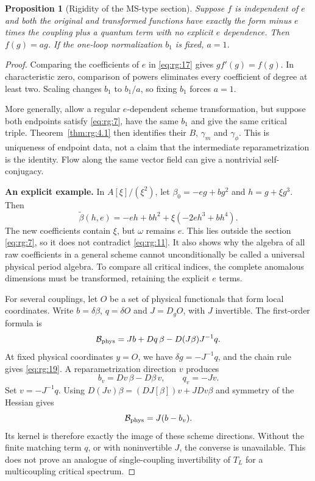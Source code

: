 \documentclass[11pt,a4paper,oneside]{article}
\theoremstyle{plain}
\newtheorem{proposition}[theorem]{Proposition}
\theoremstyle{definition}
\theoremstyle{remark}
\numberwithin{equation}{section}
\begin{document}
\begin{proposition}[Rigidity of the MS-type section]\label{thm:rg:6.1}
Suppose $f$ is independent of $e$ and both the original and transformed functions have exactly the form minus $e$ times the coupling plus a quantum term with no explicit $e$ dependence. Then $f(g)=ag$. If the one-loop normalization $b_1$ is fixed, $a=1$.
\end{proposition}
\begin{proof}
Comparing the coefficients of $e$ in \eqref{eq:rg:17} gives $gf'(g)=f(g)$. In characteristic zero, comparison of powers eliminates every coefficient of degree at least two. Scaling changes $b_1$ to $b_1/a$, so fixing $b_1$ forces $a=1$.

More generally, allow a regular $e$-dependent scheme transformation, but suppose both endpoints satisfy \eqref{eq:rg:7}, have the same $b_1$ and give the same critical triple. Theorem~\ref{thm:rg:4.1} then identifies their $B$, $\gamma_m$ and $\gamma_\phi$. This is uniqueness of endpoint data, not a claim that the intermediate reparametrization is the identity. Flow along the same vector field can give a nontrivial self-conjugacy.

\textbf{An explicit example.}
In $A[\xi]/(\xi^2)$, let $\beta_0=-eg+bg^2$ and $h=g+\xi g^3$. Then
\begin{equation}
\widetilde\beta(h,e)=-eh+b h^{2}+
                 \xi(-2e h^{3}+b h^{4}).               \label{eq:rg:18}
\end{equation}
The new coefficients contain $\xi$, but $\omega$ remains $e$. This lies outside the section \eqref{eq:rg:7}, so it does not contradict \eqref{eq:rg:11}. It also shows why the algebra of all raw coefficients in a general scheme cannot unconditionally be called a universal physical period algebra. To compare all critical indices, the complete anomalous dimensions must be transformed, retaining the explicit $e$ terms.

For several couplings, let $O$ be a set of physical functionals that form local coordinates. Write $b=\delta\beta$, $q=\delta O$ and $J=D_gO$, with $J$ invertible. The first-order formula is
\begin{equation}
{\cal B}_{\rm phys}=Jb+Dq\,\beta-D(J\beta)J^{-1}q. \label{eq:rg:19}
\end{equation}
At fixed physical coordinates $y=O$, we have $\delta g=-J^{-1}q$, and the chain rule gives \eqref{eq:rg:19}. A reparametrization direction $v$ produces
\begin{equation}
b_v=Dv\,\beta-D\beta\,v,\qquad q_v=-Jv.
\end{equation}
Set $v=-J^{-1}q$. Using $D(Jv)\beta=(DJ[\beta])v+JDv\beta$ and symmetry of the Hessian gives
\begin{equation}
{\cal B}_{\rm phys}=J(b-b_v).
\end{equation}
Its kernel is therefore exactly the image of these scheme directions. Without the finite matching term $q$, or with noninvertible $J$, the converse is unavailable. This does not prove an analogue of single-coupling invertibility of $T_L$ for a multicoupling critical spectrum.
\end{proof}
\end{document}
